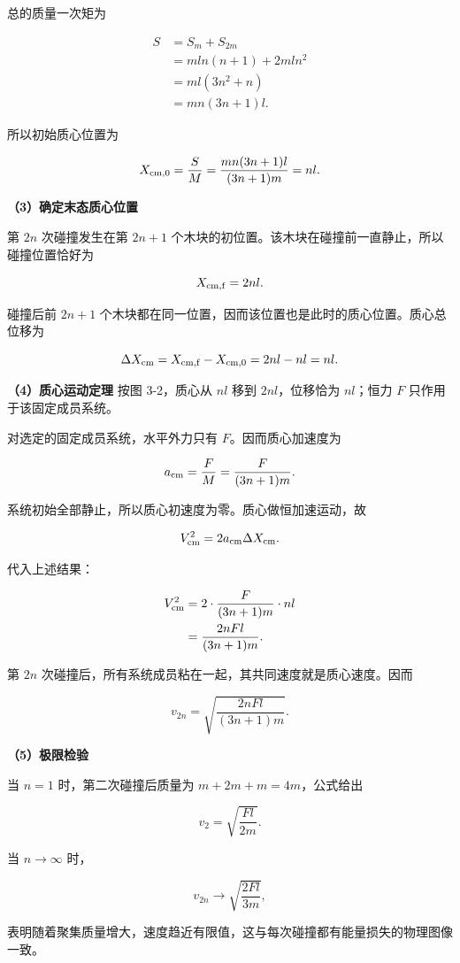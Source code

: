 \documentclass[12pt,a4paper,UTF8]{ctexart}
\begin{document}
总的质量一次矩为

\[\begin{aligned}
S
&=S_m+S_{2m}\\
&=mln(n+1)+2mln^2\\
&=ml(3n^2+n)\\
&=mn(3n+1)l.
\end{aligned}\]

所以初始质心位置为

\[X_{\rm cm,0}=\frac{S}{M}
=\frac{mn(3n+1)l}{(3n+1)m}=nl.\]

\textbf{（3）确定末态质心位置}

第 \(2n\) 次碰撞发生在第 \(2n+1\)
个木块的初位置。该木块在碰撞前一直静止，所以碰撞位置恰好为

\[X_{\rm cm,f}=2nl.\]

碰撞后前 \(2n+1\)
个木块都在同一位置，因而该位置也是此时的质心位置。质心总位移为

\[\Delta X_{\rm cm}=X_{\rm cm,f}-X_{\rm cm,0}=2nl-nl=nl.\]

\textbf{（4）质心运动定理} 按图 3-2，质心从 \(nl\) 移到
\(2nl\)，位移恰为 \(nl\)；恒力 \(F\) 只作用于该固定成员系统。

对选定的固定成员系统，水平外力只有 \(F\)。因而质心加速度为

\[a_{\rm cm}=\frac FM=\frac{F}{(3n+1)m}.\]

系统初始全部静止，所以质心初速度为零。质心做恒加速运动，故

\[V_{\rm cm}^2=2a_{\rm cm}\Delta X_{\rm cm}.\]

代入上述结果：

\[\begin{aligned}
V_{\rm cm}^2
&=2\cdot\frac{F}{(3n+1)m}\cdot nl\\
&=\frac{2nFl}{(3n+1)m}.
\end{aligned}\]

第 \(2n\) 次碰撞后，所有系统成员粘在一起，其共同速度就是质心速度。因而

\[\boxed{v_{2n}=\sqrt{\frac{2nFl}{(3n+1)m}}}.\]

\textbf{（5）极限检验}

当 \(n=1\) 时，第二次碰撞后质量为 \(m+2m+m=4m\)，公式给出

\[v_2=\sqrt{\frac{Fl}{2m}}.\]

当 \(n\to\infty\) 时，

\[v_{2n}\to\sqrt{\frac{2Fl}{3m}},\]

表明随着聚集质量增大，速度趋近有限值，这与每次碰撞都有能量损失的物理图像一致。
\end{document}
